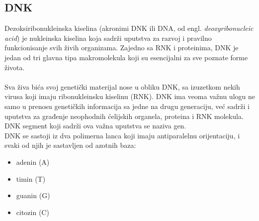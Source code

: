 \subsection{DNK}

Dezoksiribonukleinska kiselina (akronimi DNK ili DNA, od engl.  \textit{deoxyribonucleic acid}) je nukleinska kiselina koja sadrži uputstva za razvoj i pravilno funkcionisanje svih živih organizama. Zajedno sa RNK i proteinima, DNK je jedan od tri glavna tipa makromolekula koji su esencijalni za sve poznate forme života. 
\\
\\
Sva živa bića svoj genetički materijal nose u obliku DNK, sa izuzetkom nekih virusa koji imaju ribonukleinsku kiselinu (RNK). DNK ima veoma važnu ulogu ne samo u prenosu genetičkih informacija sa jedne na drugu generaciju, već sadrži i uputstva za građenje neophodnih ćelijskih organela, proteina i RNK molekula. DNK segment koji sadrži ova važna uputstva se naziva gen.\\

DNK se sastoji iz dva polimerna lanca koji imaju antiparalelnu orijentaciju, i svaki od njih je sastavljen od azotnih baza:
\begin{itemize}
	\item adenin (A)
	\item timin (T)
	\item guanin (G)
	\item citozin (C)
\end{itemize}

